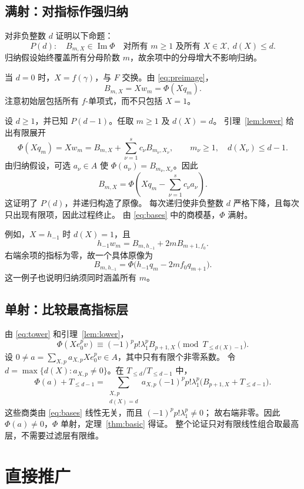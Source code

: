 \documentclass[UTF8,11pt]{ctexart}
\newcommand{\im}{\operatorname{Im}}
\theoremstyle{definition}
\begin{document}
\subsection{满射：对指标作强归纳}

对非负整数 \(d\) 证明以下命题：
\[
 P(d):\quad
 B_{m,X}\in\im\Phi\quad
 \text{对所有 }m\ge1\text{ 及所有 }X\in\mathcal X,\ d(X)\le d.
\]
归纳假设始终覆盖所有分母阶数 \(m\)，故余项中的分母增大不影响归纳。

当 \(d=0\) 时，\(X=f(\gamma)\)，与 \(F\) 交换。由 \eqref{eq:preimage}，
\[
 B_{m,X}=Xw_m=\Phi(Xq_m).
\]
注意初始层包括所有 \(f\)-单项式，而不只包括 \(X=1\)。

设 \(d\ge1\)，并已知 \(P(d-1)\)。任取 \(m\ge1\) 及 \(d(X)=d\)。
引理~\ref{lem:lower} 给出有限展开
\[
 \Phi(Xq_m)=Xw_m
   =B_{m,X}+\sum_{\nu=1}^{s}c_\nu B_{m_\nu,X_\nu},
 \qquad m_\nu\ge1,\quad d(X_\nu)\le d-1.
\]
由归纳假设，可选 \(a_\nu\in A\) 使
\(\Phi(a_\nu)=B_{m_\nu,X_\nu}\)。因此
\[
 B_{m,X}
   =\Phi\left(Xq_m-\sum_{\nu=1}^{s}c_\nu a_\nu\right).
\]
这证明了 \(P(d)\)，并递归构造了原像。
每次递归使非负整数 \(d\) 严格下降，且每次只出现有限项，因此过程终止。
由 \eqref{eq:bases} 中的商模基，\(\Phi\) 满射。

例如，\(X=h_{-1}\) 时 \(d(X)=1\)，且
\[
 h_{-1}w_m=B_{m,h_{-1}}+2mB_{m+1,f_0}.
\]
右端余项的指标为零，故一个具体原像为
\[
 B_{m,h_{-1}}=\Phi\bigl(h_{-1}q_m-2mf_0q_{m+1}\bigr).
\]
这一例子也说明归纳须同时涵盖所有 \(m\)。

\subsection{单射：比较最高指标层}

由 \eqref{eq:tower} 和引理~\ref{lem:lower}，
\begin{equation}\label{eq:leading}
 \Phi(Xe_0^pv)
  \equiv (-1)^pp!\lambda_1^pB_{p+1,X}\pmod{T_{\le d(X)-1}}.
\end{equation}
设 \(0\ne a=\sum_{X,p}a_{X,p}Xe_0^pv\in A\)，其中只有有限个非零系数。
令 \(d=\max\{d(X):a_{X,p}\ne0\}\)。在 \(T_{\le d}/T_{\le d-1}\) 中，
\[
 \Phi(a)+T_{\le d-1}
  =\sum_{\substack{X,p\\d(X)=d}}
    a_{X,p}(-1)^pp!\lambda_1^p\bigl(B_{p+1,X}+T_{\le d-1}\bigr).
\]
这些商类由 \eqref{eq:bases} 线性无关，而且 \((-1)^pp!\lambda_1^p\ne0\)；
故右端非零。因此 \(\Phi(a)\ne0\)，\(\Phi\) 单射，定理~\ref{thm:basic} 得证。
整个论证只对有限线性组合取最高层，不需要过滤层有限维。

\section{直接推广}
\end{document}
